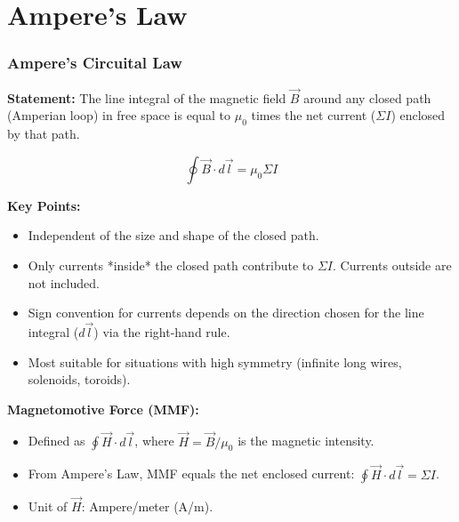 \section{Ampere's Law}

\transfade[duration=0.5]

\begin{frame}[t]
    \frametitle{\textcolor{deepnavy}{\textbf{Ampere's Circuital Law}}}
    \renewcommand{\familydefault}{\rmdefault}
    \small

      \item<+-> \textbf{Statement:} The line integral of the magnetic field $\vec{B}$ around any closed path (Amperian loop) in free space is equal to $\mu_0$ times the net current ($\Sigma I$) enclosed by that path.
        \begin{tcolorbox}[colback=orange!8,colframe=accentorange,boxrule=0.5pt,arc=1mm,boxsep=2pt]
        \begin{equation*}
             \oint \vec{B} \cdot d\vec{l} = \mu_0 \Sigma I
        \end{equation*}
        \end{tcolorbox}

    \item<+-> \textbf{Key Points:}
        \begin{itemize}[<+->]
              \item Independent of the size and shape of the closed path.
            \item Only currents *inside* the closed path contribute to $\Sigma I$.   Currents outside are not included.
              \item Sign convention for currents depends on the direction chosen for the line integral ($d\vec{l}$) via the right-hand rule.
              \item Most suitable for situations with high symmetry (infinite long wires, solenoids, toroids).
        \end{itemize}

    \vspace{0.5em}

      \item<+-> \textbf{Magnetomotive Force (MMF):}
        \begin{itemize}
              \item Defined as $\oint \vec{H} \cdot d\vec{l}$, where $\vec{H} = \vec{B}/\mu_0$ is the magnetic intensity.
              \item From Ampere's Law, MMF equals the net enclosed current: $\oint \vec{H} \cdot d\vec{l} = \Sigma I$.
              \item Unit of $\vec{H}$: Ampere/meter (A/m).
        \end{itemize}
\end{frame}

